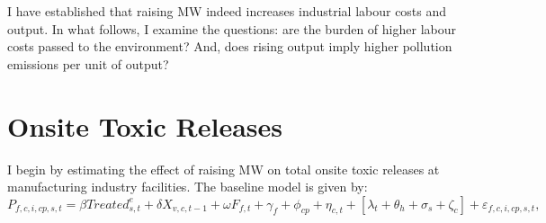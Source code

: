 \documentclass[12pt, english]{article}
\begin{document}
    I have established that raising MW indeed increases industrial labour costs and output. In what follows, I examine the questions: are the burden of higher labour costs passed to the environment? And, does rising output imply higher pollution emissions per unit of output?


    \section{Onsite Toxic Releases}\label{sec:onsite-toxic-releases}
    I begin by estimating the effect of raising MW on total onsite toxic releases at manufacturing industry facilities. The baseline model is given by:
    \begin{equation}
        P_{f,c,i,cp,s,t} = \beta Treated_{s,t}^e + \delta X_{v,c,t-1} + \omega F_{f,t} + \gamma_{f} + \phi_{cp} + \eta_{c,t} + \left[\lambda_{t} + \theta_{h} + \sigma_{s} + \zeta_{c} \right] + \varepsilon_{f,c,i,cp,s,t},\label{eq:baseline-total-onsite-releases-intensity}
    \end{equation}
\end{document}
